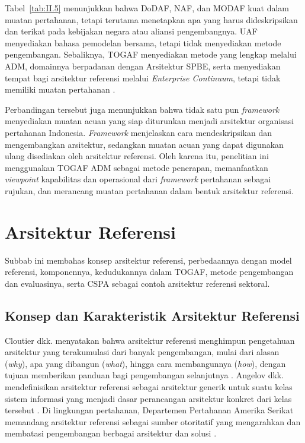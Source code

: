 Tabel~\ref{tab:II.5} menunjukkan bahwa DoDAF, NAF, dan MODAF kuat dalam muatan pertahanan, tetapi terutama menetapkan apa yang harus dideskripsikan dan terikat pada kebijakan negara atau aliansi pengembangnya. UAF menyediakan bahasa pemodelan bersama, tetapi tidak menyediakan metode pengembangan. Sebaliknya, TOGAF menyediakan metode yang lengkap melalui ADM, domainnya berpadanan dengan Arsitektur SPBE, serta menyediakan tempat bagi arsitektur referensi melalui \textit{Enterprise Continuum}, tetapi tidak memiliki muatan pertahanan \cite{TOGAF2022}.

Perbandingan tersebut juga menunjukkan bahwa tidak satu pun \textit{framework} menyediakan muatan acuan yang siap diturunkan menjadi arsitektur organisasi pertahanan Indonesia. \textit{Framework} menjelaskan cara mendeskripsikan dan mengembangkan arsitektur, sedangkan muatan acuan yang dapat digunakan ulang disediakan oleh arsitektur referensi. Oleh karena itu, penelitian ini menggunakan TOGAF ADM sebagai metode penerapan, memanfaatkan \textit{viewpoint} kapabilitas dan operasional dari \textit{framework} pertahanan sebagai rujukan, dan merancang muatan pertahanan dalam bentuk arsitektur referensi.

\section{Arsitektur Referensi}
\label{sec:II.6}

Subbab ini membahas konsep arsitektur referensi, perbedaannya dengan model referensi, komponennya, kedudukannya dalam TOGAF, metode pengembangan dan evaluasinya, serta CSPA\label{sk:CSPA} sebagai contoh arsitektur referensi sektoral.

\subsection{Konsep dan Karakteristik Arsitektur Referensi}
\label{sec:II.6.1}

Cloutier dkk. menyatakan bahwa arsitektur referensi menghimpun pengetahuan arsitektur yang terakumulasi dari banyak pengembangan, mulai dari alasan (\textit{why}), apa yang dibangun (\textit{what}), hingga cara membangunnya (\textit{how}), dengan tujuan memberikan panduan bagi pengembangan selanjutnya \cite{Cloutier2010}. Angelov dkk. mendefinisikan arsitektur referensi sebagai arsitektur generik untuk suatu kelas sistem informasi yang menjadi dasar perancangan arsitektur konkret dari kelas tersebut \cite{Angelov2009}. Di lingkungan pertahanan, Departemen Pertahanan Amerika Serikat memandang arsitektur referensi sebagai sumber otoritatif yang mengarahkan dan membatasi pengembangan berbagai arsitektur dan solusi \cite{DoDCIO2010RA}.

